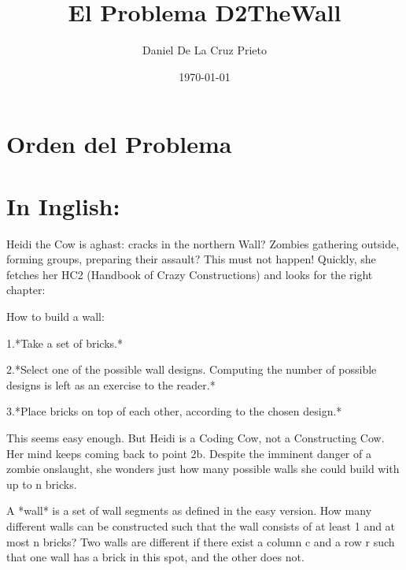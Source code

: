 \documentclass[12pt]{article}
\begin{document}
    \title{El Problema D2TheWall}
    \author{Daniel De La Cruz Prieto}
    \date{\today}

    \maketitle

    \section*{Orden del Problema}
    
    \section*{In Inglish:}
    
    \begin{flushleft}
        Heidi the Cow is aghast: cracks in the northern Wall? Zombies gathering outside, forming groups, preparing their assault? This must not happen! Quickly, she fetches her HC2 (Handbook of Crazy Constructions) and looks for the right chapter:
    \end{flushleft}
    \begin{flushleft}
        How to build a wall:
    \end{flushleft}
    \begin{flushleft}
        1.*Take a set of bricks.*
    \end{flushleft}
    \begin{flushleft}
        2.*Select one of the possible wall designs. Computing the number of possible designs is left as an exercise to the reader.*
    \end{flushleft}
    \begin{flushleft}
        3.*Place bricks on top of each other, according to the chosen design.*
    \end{flushleft}
    \begin{flushleft}
        This seems easy enough. But Heidi is a Coding Cow, not a Constructing Cow. Her mind keeps coming back to point 2b. Despite the imminent danger of a zombie onslaught, she wonders just how many possible walls she could build with up to n bricks.
    \end{flushleft}
    \begin{flushleft}
        A *wall* is a set of wall segments as defined in the easy version. How many different walls can be constructed such that the wall consists of at least 1 and at most n bricks? Two walls are different if there exist a column c and a row r such that one wall has a brick in this spot, and the other does not.
    \end{flushleft}
\end{document}
